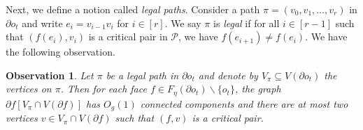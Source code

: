 \documentclass[a4paper,11pt]{article}
\numberwithin{lemma}{section}
\newtheorem{observation}[lemma]{Observation}
\begin{document}
Next, we define a notion called \textit{legal paths}.
Consider a path $\pi = (v_0,v_1,\dots,v_r)$ in $\partial o_t$ and write $e_i = v_{i-1}v_i$ for $i \in [r]$.
We say $\pi$ is \textit{legal} if for all $i \in [r-1]$ such that $(f(e_i),v_i)$ is a critical pair in $\mathcal{P}$, we have $f(e_{i+1}) \neq f(e_i)$.
We have the following observation.

\begin{observation}\label{obs-legal}
Let $\pi$ be a legal path in $\partial o_t$ and denote by $V_\pi \subseteq V(\partial o_t)$ the vertices on $\pi$.
Then for each face $f \in F_\eta(\partial o_t) \backslash \{o_t\}$, the graph $\partial f [V_\pi \cap V(\partial f)]$ has $O_g(1)$ connected components and there are at most two vertices $v \in V_\pi \cap V(\partial f)$ such that $(f,v)$ is a critical pair.
\end{observation}
\end{document}

